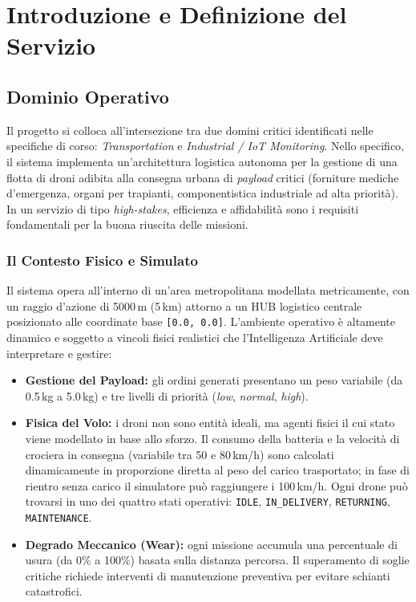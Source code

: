
\chapter{Introduzione e Definizione del Servizio}
\label{cap:introduzione_definizione}

\section{Dominio Operativo}
\label{sec:dominio_operativo}

Il progetto si colloca all'intersezione tra due domini critici identificati nelle specifiche di corso: \textit{Transportation} e \textit{Industrial / IoT Monitoring}. Nello specifico, il sistema implementa un'architettura logistica autonoma per la gestione di una flotta di droni adibita alla consegna urbana di \textit{payload} critici (forniture mediche d'emergenza, organi per trapianti, componentistica industriale ad alta priorità). In un servizio di tipo \textit{high-stakes}, efficienza e affidabilità sono i requisiti fondamentali per la buona riuscita delle missioni.

\subsection*{Il Contesto Fisico e Simulato}

Il sistema opera all'interno di un'area metropolitana modellata metricamente, con un raggio d'azione di 5000\,m (5\,km) attorno a un HUB logistico centrale posizionato alle coordinate base \texttt{[0.0, 0.0]}. L'ambiente operativo è altamente dinamico e soggetto a vincoli fisici realistici che l'Intelligenza Artificiale deve interpretare e gestire:

\begin{itemize}
    \item \textbf{Gestione del Payload:} gli ordini generati presentano un peso variabile (da 0.5\,kg a 5.0\,kg) e tre livelli di priorità (\textit{low}, \textit{normal}, \textit{high}).
    \item \textbf{Fisica del Volo:} i droni non sono entità ideali, ma agenti fisici il cui stato viene modellato in base allo sforzo. Il consumo della batteria e la velocità di crociera in consegna (variabile tra 50 e 80\,km/h) sono calcolati dinamicamente in proporzione diretta al peso del carico trasportato; in fase di rientro senza carico il simulatore può raggiungere i 100\,km/h. Ogni drone può trovarsi in uno dei quattro stati operativi: \texttt{IDLE}, \texttt{IN\_DELIVERY}, \texttt{RETURNING}, \texttt{MAINTENANCE}.
    \item \textbf{Degrado Meccanico (Wear):} ogni missione accumula una percentuale di usura (da 0\% a 100\%) basata sulla distanza percorsa. Il superamento di soglie critiche richiede interventi di manutenzione preventiva per evitare schianti catastrofici.
\end{itemize}

